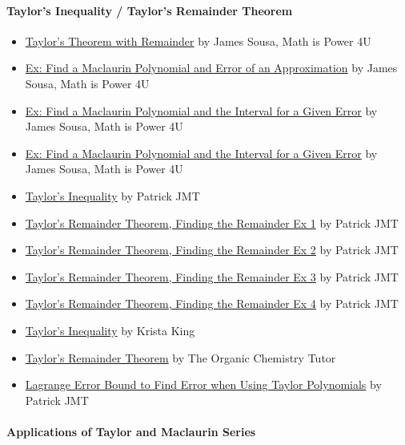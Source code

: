 \paragraph{Taylor's Inequality / Taylor's Remainder Theorem}



\begin{itemize}
    \item \href{https://www.youtube.com/watch?v=DP_pGQaNGdw}{Taylor's Theorem with Remainder} by James Sousa, Math is Power 4U
    \item \href{https://www.youtube.com/watch?v=wqgAG9TtNAA}{Ex: Find a Maclaurin Polynomial and Error of an Approximation} by James Sousa, Math is Power 4U
    \item \href{https://www.youtube.com/watch?v=CExJJShnzzg}{Ex: Find a Maclaurin Polynomial and the Interval for a Given Error} by James Sousa, Math is Power 4U
    \item \href{https://www.youtube.com/watch?v=lwEU4ZkwcJA}{Ex: Find a Maclaurin Polynomial and the Interval for a Given Error} by James Sousa, Math is Power 4U
    \item \href{https://www.youtube.com/watch?v=9LnCcAoEHG4}{Taylor's Inequality} by Patrick JMT
    \item \href{https://www.youtube.com/watch?v=yJWFAG1g4Jw}{Taylor's Remainder Theorem, Finding the Remainder Ex 1} by Patrick JMT
    \item \href{https://www.youtube.com/watch?v=30n1eiu8lFs}{Taylor's Remainder Theorem, Finding the Remainder Ex 2} by Patrick JMT
    \item \href{https://www.youtube.com/watch?v=pZBRc5uegEs}{Taylor's Remainder Theorem, Finding the Remainder Ex 3} by Patrick JMT
    \item \href{https://www.youtube.com/watch?v=aa0hyXZH9vw}{Taylor's Remainder Theorem, Finding the Remainder Ex 4} by Patrick JMT
    \item \href{https://www.youtube.com/watch?v=xsCTDZQULJ4}{Taylor's Inequality} by Krista King
    \item \href{https://www.youtube.com/watch?v=lY0LzJXTgeo}{Taylor's Remainder Theorem} by The Organic Chemistry Tutor
    \item \href{https://www.youtube.com/watch?v=Q9y43_02vFw}{Lagrange Error Bound to Find Error when Using Taylor Polynomials} by Patrick JMT
\end{itemize}

\paragraph{Applications of Taylor and Maclaurin Series}



